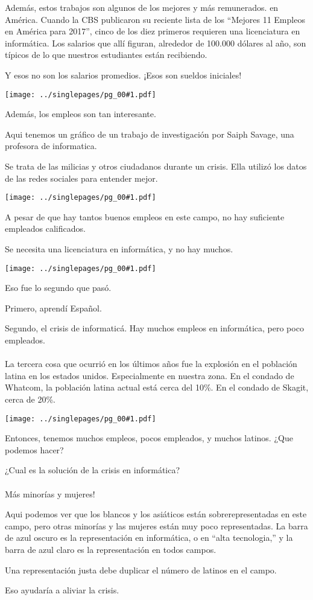 \documentclass[12pt]{article}
\newcommand{\cue}{\mbox{}\\
  \fbox{\sf Next slide}
\\}
\newcommand{\fig}[1]{
  \newpage  
  \begin{center}
    \texttt{[image: ../singlepages/pg\_00\#1.pdf]}
  \end{center}
  
}
\begin{document}
Además, estos trabajos son algunos de los mejores y más remunerados.
en América.  Cuando la CBS publicaron su reciente lista de los
``Mejores 11 Empleos en América para 2017'', cinco de los diez
primeros requieren una licenciatura en informática.  Los salarios que
allí figuran, alrededor de 100.000 dólares al año, son típicos de lo
que nuestros estudiantes están recibiendo.

Y esos no son los salarios promedios.  ¡Esos son sueldos iniciales!


\fig{11}

Además, los empleos son tan interesante.

Aqui tenemos un gráfico de
un trabajo de investigación por Saiph Savage, una profesora de
informatica.

Se trata de las milicias y otros ciudadanos durante un
crisis.  Ella utilizó los datos de las redes sociales para entender
mejor.


\fig{12}

A pesar de que hay tantos buenos empleos en este campo,
no hay suficiente empleados calificados.

Se necesita una licenciatura en informática, y no hay muchos.


\fig{14}
Eso fue lo segundo que pasó.

Primero, aprendí Español.

Segundo, el crisis de informaticá.
Hay muchos empleos en informática, pero poco empleados.
\cue
La tercera cosa que ocurrió en los últimos años fue la explosión en el
población latina en los estados unidos.  Especialmente en nuestra
zona.  En el condado de Whatcom, la población latina actual está cerca
del 10\%.  En el condado de Skagit, cerca de 20\%. 

\fig{16}


Entonces, tenemos muchos empleos, pocos empleados, y muchos latinos.
¿Que podemos hacer?

¿Cual es la solución de la crisis en informática?
\cue
Más minorías y mujeres!

Aqui podemos ver que los blancos y los asiáticos están
sobrerepresentadas en este campo, pero otras minorías y las mujeres
están muy poco representadas.  La barra de azul oscuro es la
representación en informática, o en ``alta tecnologia,'' y la barra de
azul claro es la representación en todos campos.

Una representación justa debe duplicar el número de latinos en el
campo.

Eso ayudaría a aliviar la crisis.
\end{document}
